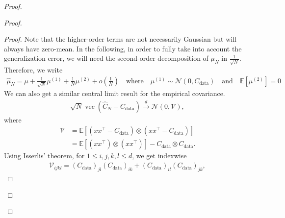 \documentclass[11pt]{article}
\newcommand{\id}{\operatorname{Id}}
\newcommand{\EE}{\mathbb{E}}
\begin{document}
\begin{proof}
\begin{proof}
\begin{proof}
Note that the higher-order terms are not necessarily Gaussian but will always have zero-mean. In the following, in order to fully take into account the generalization error, we will need the second-order decomposition of $\mu_N$ in $\frac{1}{\sqrt{N}}$. Therefore, we write 
\begin{align*} 
\hat  \mu_N = \mu + \frac{1}{\sqrt{N}} \mu^{(1)} + \frac{1}{N}\mu^{(2)} + o\left(\frac{1}{N}\right) \quad \text{where} \quad \mu^{(1)} \sim \mathcal{N} (0, C_\mathrm{data}) \quad \text{and} \quad \EE[\mu^{(2)}] = 0
\end{align*}
We can also get a similar central limit result for the empirical covariance. 
\begin{align*}
    \sqrt{N} \operatorname{vec} ( \hat C_N - C_\mathrm{data}) \xrightarrow{d} \mathcal{N} (0, \mathcal{V}),
\end{align*}
where
\begin{align*}
\mathcal{V} &= \EE[(xx^\top - C_\mathrm{data}) \otimes (xx^\top - C_\mathrm{data}) ] \\ 
&= \EE[(xx^\top) \otimes (xx^\top) ] - C_\mathrm{data} \otimes C_\mathrm{data}.
\end{align*}
Using Isserlis' theorem, for $1 \leq i,j,k,l \leq d$, we get indexwise
\begin{align*}
\mathcal{V}_{ijkl} = (C_\mathrm{data})_{jl}  (C_\mathrm{data})_{ik} + (C_\mathrm{data})_{il}  (C_\mathrm{data})_{jk},
\end{align*}

\end{proof}
\end{proof}
\end{proof}
\end{document}
